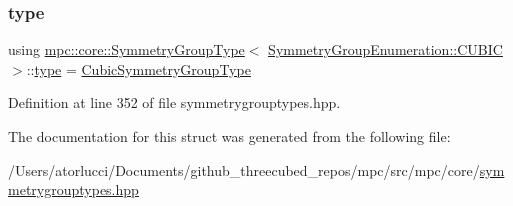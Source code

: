 \subsubsection{\texorpdfstring{type}{type}}
{\footnotesize\ttfamily using \mbox{\hyperlink{structmpc_1_1core_1_1_symmetry_group_type}{mpc\+::core\+::\+Symmetry\+Group\+Type}}$<$ \mbox{\hyperlink{namespacempc_1_1core_a9d979684062547055a0ef5c13077bad8accd681e34e5e40fbce74618c3ccffcff}{Symmetry\+Group\+Enumeration\+::\+C\+U\+B\+IC}} $>$\+::\mbox{\hyperlink{structmpc_1_1core_1_1_symmetry_group_type_3_01_symmetry_group_enumeration_1_1_c_u_b_i_c_01_4_a381fca992534548373952578220385cb}{type}} =  \mbox{\hyperlink{structmpc_1_1core_1_1_cubic_symmetry_group_type}{Cubic\+Symmetry\+Group\+Type}}}



Definition at line 352 of file symmetrygrouptypes.\+hpp.



The documentation for this struct was generated from the following file\+:\begin{DoxyCompactItemize}
\item 
/\+Users/atorlucci/\+Documents/github\+\_\+threecubed\+\_\+repos/mpc/src/mpc/core/\mbox{\hyperlink{symmetrygrouptypes_8hpp}{symmetrygrouptypes.\+hpp}}\end{DoxyCompactItemize}
